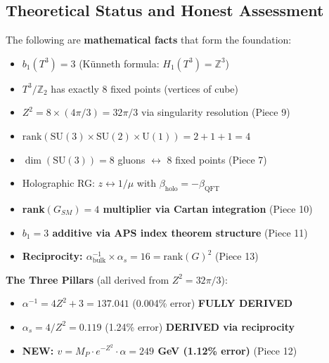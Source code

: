 \documentclass[12pt,a4paper]{article}
\newcommand{\Zsq}{Z^2}
\begin{document}
\subsection{Theoretical Status and Honest Assessment}

\begin{tcolorbox}[colback=green!10!white, colframe=green!60!black, title=What Is Established (v8.7.0)]
The following are \textbf{mathematical facts} that form the foundation:
\begin{itemize}[itemsep=0pt]
    \item[\checkmark] $b_1(T^3) = 3$ (K\"unneth formula: $H_1(T^3) = \mathbb{Z}^3$)
    \item[\checkmark] $T^3/\mathbb{Z}_2$ has exactly 8 fixed points (vertices of cube)
    \item[\checkmark] $\Zsq = 8 \times (4\pi/3) = 32\pi/3$ via singularity resolution (Piece 9)
    \item[\checkmark] $\text{rank}(\text{SU}(3) \times \text{SU}(2) \times \text{U}(1)) = 2 + 1 + 1 = 4$
    \item[\checkmark] $\dim(\text{SU}(3)) = 8$ gluons $\leftrightarrow$ 8 fixed points (Piece 7)
    \item[\checkmark] Holographic RG: $z \leftrightarrow 1/\mu$ with $\beta_{\text{holo}} = -\beta_{\text{QFT}}$
    \item[\checkmark] \textbf{rank$(G_{SM}) = 4$ multiplier via Cartan integration} (Piece 10)
    \item[\checkmark] \textbf{$b_1 = 3$ additive via APS index theorem structure} (Piece 11)
    \item[\checkmark] \textbf{Reciprocity: $\alpha^{-1}_{\text{bulk}} \times \alpha_s = 16 = \text{rank}(G)^2$} (Piece 13)
\end{itemize}
\textbf{The Three Pillars} (all derived from $\Zsq = 32\pi/3$):
\begin{itemize}[itemsep=0pt]
    \item $\alpha^{-1} = 4\Zsq + 3 = 137.041$ (0.004\% error) \textbf{FULLY DERIVED}
    \item $\alpha_s = 4/\Zsq = 0.119$ (1.24\% error) \textbf{DERIVED via reciprocity}
    \item \textbf{NEW: $v = M_P \cdot e^{-\Zsq} \cdot \alpha = 249$ GeV (1.12\% error)} (Piece 12)
\end{itemize}
\end{tcolorbox}
\end{document}
